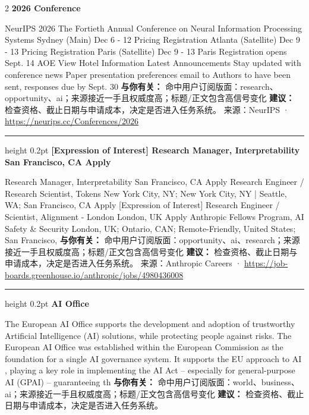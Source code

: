 \documentclass[10.5pt]{ctexart}
\begin{document}
\begin{multicols}{2}
{\large\bfseries 2026 Conference}\par
NeurIPS 2026 The Fortieth Annual Conference on Neural Information Processing Systems Sydney (Main) Dec 6 - 12 Pricing Registration Atlanta (Satellite) Dec 9 - 13 Pricing Registration Paris (Satellite) Dec 9 - 13 Paris Registration opens Sept. 14 AOE View Hotel Information Latest Announcements Stay updated with conference news Paper presentation preferences email to Authors to have been sent, responses due by Sept. 30
\textbf{与你有关：} 命中用户订阅版面：research、opportunity、ai；来源接近一手且权威度高；标题/正文包含高信号变化
\textbf{建议：} 检查资格、截止日期与申请成本，决定是否进入任务系统。
{\footnotesize\color{ormuted} 来源：NeurIPS · \url{https://neurips.cc/Conferences/2026}}
\vspace{2mm}
\hrule height 0.2pt
\vspace{2mm}
{\large\bfseries [Expression of Interest] Research Manager, Interpretability San Francisco, CA Apply}\par
[Expression of Interest] Research Manager, Interpretability San Francisco, CA Apply Research Engineer / Research Scientist, Tokens New York City, NY; New York City, NY | Seattle, WA; San Francisco, CA Apply [Expression of Interest] Research Engineer / Scientist, Alignment - London London, UK Apply Anthropic Fellows Program, AI Safety \& Security London, UK; Ontario, CAN; Remote-Friendly, United States; San Francisco, 
\textbf{与你有关：} 命中用户订阅版面：opportunity、ai、research；来源接近一手且权威度高；标题/正文包含高信号变化
\textbf{建议：} 检查资格、截止日期与申请成本，决定是否进入任务系统。
{\footnotesize\color{ormuted} 来源：Anthropic Careers · \url{https://job-boards.greenhouse.io/anthropic/jobs/4980436008}}
\vspace{2mm}
\hrule height 0.2pt
\vspace{2mm}
{\large\bfseries AI Office}\par
The European AI Office supports the development and adoption of trustworthy Artificial Intelligence (AI) solutions, while protecting people against risks. The European AI Office was established within the European Commission as the foundation for a single AI governance system. It supports the EU approach to AI , playing a key role in implementing the AI Act – especially for general-purpose AI (GPAI) – guaranteeing th
\textbf{与你有关：} 命中用户订阅版面：world、business、ai；来源接近一手且权威度高；标题/正文包含高信号变化
\textbf{建议：} 检查资格、截止日期与申请成本，决定是否进入任务系统。

\end{multicols}
\end{document}
